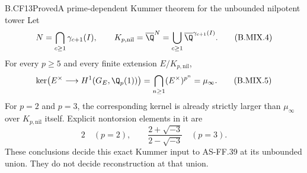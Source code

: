 \begin{claim}{B.CF13}{Proved}{A prime-dependent Kummer theorem for the unbounded nilpotent tower}
Let
\[
 N=\bigcap_{c\geq1}\gamma_{c+1}(I),\qquad
 K_{p,\mathrm{nil}}=\overline\Q^N
      =\bigcup_{c\geq1}\overline\Q^{\gamma_{c+1}(I)}.
                                                        \tag{B.MIX.4}
\]
For every \(p\geq5\) and every finite extension
\(E/K_{p,\mathrm{nil}}\),
\[
 \ker\!\left(E^\times\longrightarrow H^1(G_E,\Q_p(1))\right)
       =\bigcap_{n\geq1}(E^\times)^{p^n}
       =\mu_\infty.                                    \tag{B.MIX.5}
\]
For \(p=2\) and \(p=3\), the corresponding kernel is already
strictly larger than \(\mu_\infty\) over
\(K_{p,\mathrm{nil}}\) itself. Explicit nontorsion elements in it are
\[
       2\quad(p=2),\qquad
       \frac{2+\sqrt{-3}}{2-\sqrt{-3}}\quad(p=3).         \tag{B.MIX.6}
\]
These conclusions decide this exact Kummer input to AS-FF.39 at its
unbounded union. They do not decide reconstruction at that union.
\end{claim}
